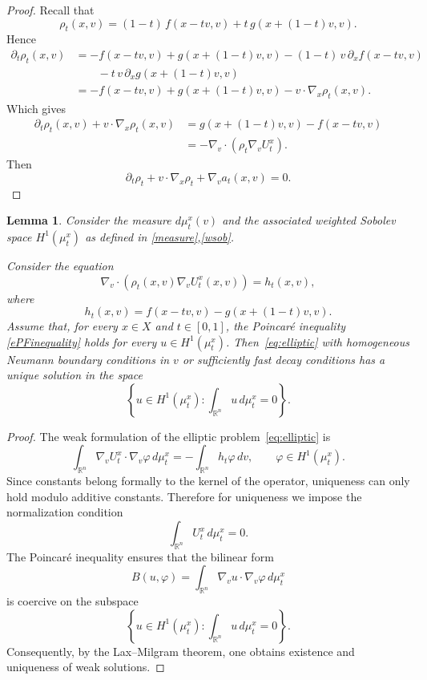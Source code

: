 \documentclass[11pt]{article}
\newtheorem{lemma}{Lemma}[section]
\newcommand{\R}{{\mathbb R}}
\begin{document}
\begin{proof}
Recall that
$$
    \rho_t(x,v) = (1-t) \, f(x-tv,v) +  t \, g(x+(1-t)v,v).
$$
Hence
\begin{align*}
   \partial_t  \rho_t(x,v) 
& = - f(x-tv,v) +  g(x+(1-t)v,v)     - (1-t) \, v \, \partial_x f(x-tv,v) \\
   & \qquad -  t \, v \, \partial_x g(x+(1-t)v,v) \\
   & = - f(x-tv,v) +  g(x+(1-t)v,v)  - v \cdot \nabla_x \rho_t (x,v).
\end{align*}
Which gives
\begin{align*}
\partial_t  \rho_t(x,v) + v \cdot \nabla_x \rho_t (x,v) & = g(x+(1-t)v,v) - f(x-tv,v)\\
& =  
- \nabla_v\cdot(\rho_t\nabla_v U_t^x).
\end{align*}
Then
$$
 \partial_t\rho_t+v\cdot\nabla_x\rho_t  + \nabla_v a_t(x,v) = 0.
$$
\end{proof}

\begin{lemma}\label{step2}
Consider  the measure $d\mu_t^x(v)$ and the associated weighted Sobolev space $H^1(\mu_t^x)$ as defined in \eqref{measure},\eqref{wsob}. 


Consider the equation
\begin{equation}\label{eq:elliptic}
\nabla_v\cdot(\rho_t(x,v)\nabla_v U_t^x(x,v))
=
h_t(x,v),
\end{equation}
where
\[
h_t(x,v) = f(x-tv,v)-g(x+(1-t)v,v).
\]
Assume that, for every $x \in X$ and $t\in[0,1]$, the Poincar\'e inequality \eqref{ePFinequality} holds for every $u \in H^1(\mu_t^x)$.
Then~\eqref{eq:elliptic} with homogeneous Neumann boundary conditions in $v$ or sufficiently fast decay conditions has a unique solution in the space
\[
\left\{
u\in H^1(\mu_t^x):
\int_{\R^n}u\,d\mu_t^x=0
\right\}.
\]
\end{lemma}
\begin{proof}

The weak formulation of the elliptic problem~\eqref{eq:elliptic} is
\[
\int_{\R^n}
\nabla_v U_t^x\cdot\nabla_v\varphi
\,d\mu_t^x
=
- \int_{\R^n}
h_t\varphi\,dv,
\qquad \varphi\in H^1(\mu_t^x).
\]
Since constants belong formally to the kernel of the operator, uniqueness
can only hold modulo additive constants. Therefore for uniqueness 
we impose the normalization condition
\begin{equation}
\int_{\R^n} U_t^x\,d\mu_t^x=0 .
\label{eUniqCond}
\end{equation}
The Poincar\'e
inequality ensures that the bilinear form
\[
B(u,\varphi)
=
\int_{\R^n}
\nabla_v u\cdot\nabla_v\varphi
\,d\mu_t^x
\]
is coercive on the subspace
\[
\left\{
u\in H^1(\mu_t^x):
\int_{\R^n}u\,d\mu_t^x=0
\right\}.
\]
Consequently, by the Lax--Milgram theorem, one obtains existence and
uniqueness of weak solutions. 
\end{proof}
\end{document}
